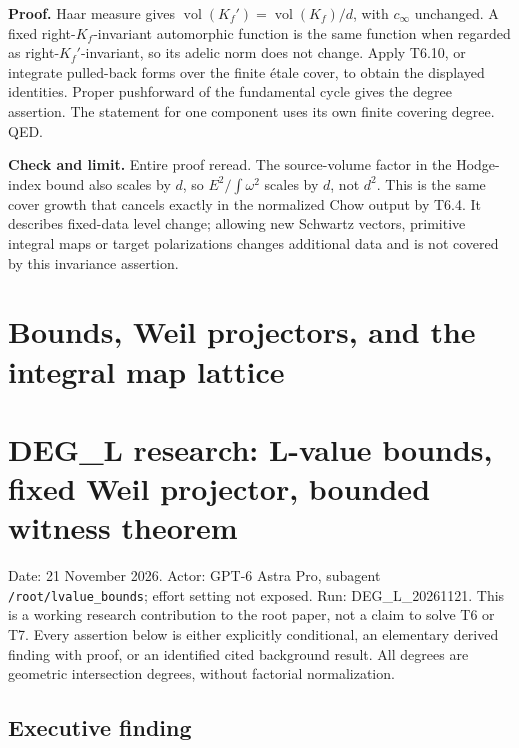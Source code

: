 \documentclass[11pt,a4paper]{article}
\providecommand{\tightlist}{\setlength{\itemsep}{0pt}\setlength{\parskip}{0pt}}
\theoremstyle{definition}
\begin{document}
\textbf{Proof.} Haar measure gives \(\operatorname{vol}(K_f')=\operatorname{vol}(K_f)/d\), with \(c_\infty\) unchanged. A fixed right-\(K_f\)-invariant automorphic function is the same function when regarded as right-\(K_f'\)-invariant, so its adelic norm does not change. Apply T6.10, or integrate pulled-back forms over the finite étale cover, to obtain the displayed identities. Proper pushforward of the fundamental cycle gives the degree assertion. The statement for one component uses its own finite covering degree. QED.

\textbf{Check and limit.} Entire proof reread. The source-volume factor in the Hodge-index bound also scales by \(d\), so \(E^2/\int\omega^2\) scales by \(d\), not \(d^2\). This is the same cover growth that cancels exactly in the normalized Chow output by T6.4. It describes fixed-data level change; allowing new Schwartz vectors, primitive integral maps or target polarizations changes additional data and is not covered by this invariance assertion.

\section{Bounds, Weil projectors, and the integral map lattice}

\providecommand{\tightlist}{\setlength{\itemsep}{0pt}\setlength{\parskip}{0pt}}
\section{DEG\_L research: L-value bounds, fixed Weil projector, bounded witness theorem}\label{deg_l-research-l-value-bounds-fixed-weil-projector-bounded-witness-theorem}

Date: 21 November 2026. Actor: GPT-6 Astra Pro, subagent \texttt{/root/lvalue\_bounds}; effort setting not exposed. Run: DEG\_L\_20261121. This is a working research contribution to the root paper, not a claim to solve T6 or T7. Every assertion below is either explicitly conditional, an elementary derived finding with proof, or an identified cited background result. All degrees are geometric intersection degrees, without factorial normalization.

\subsection{Executive finding}\label{executive-finding}
\end{document}
